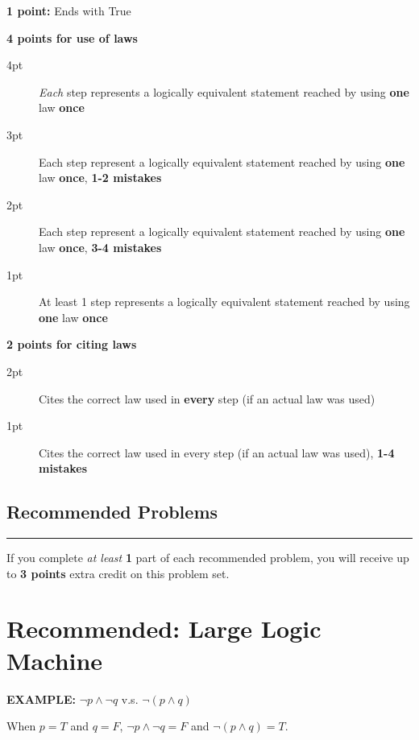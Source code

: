 \documentclass[homework, problems]{../../latex-common/cs151-common}
\begin{document}
\begin{enumeratequestions}
\begin{rubric}
        \textbf{1 point:} Ends with True
        
        \textbf{4 points for use of laws}
        \begin{description}
            \item[4pt] \textit{Each} step represents a logically equivalent statement reached by using \textbf{one} law \textbf{once}
            \item[3pt] Each step represent a logically equivalent statement reached by using \textbf{one} law \textbf{once}, \textbf{1-2 mistakes}
            \item[2pt] Each step represent a logically equivalent statement reached by using \textbf{one} law \textbf{once}, \textbf{3-4 mistakes}
            \item[1pt] At least 1 step represents a logically equivalent statement reached by using \textbf{one} law \textbf{once}
        \end{description}

        \textbf{2 points for citing laws}
        \begin{description}
            \item[2pt] Cites the correct law used in \textbf{every} step (if an actual law was used)
            \item[1pt] Cites the correct law used in every step (if an actual law was used), \textbf{1-4 mistakes}
        \end{description}
    \end{rubric}
\end{enumeratequestions}

\begin{center}
\section*{\hfill \huge Recommended Problems \hfill}
\end{center}
\vspace{-3mm}
\rule{\textwidth}{1pt}
\vspace{-2mm}

If you complete \textit{at least} \textbf{1} part of each recommended problem, you will receive up to \textbf{3 points} extra credit on this problem set. 

\section{Recommended: Large Logic Machine}
\begin{example}
    \textbf{EXAMPLE:} $\neg p \land \neg q$ v.s. $\neg (p\land q)$

    When $p=T$ and $q=F$, $\neg p \land \neg q = F$ and $\neg (p\land q) = T$.
\end{example}
\end{document}

